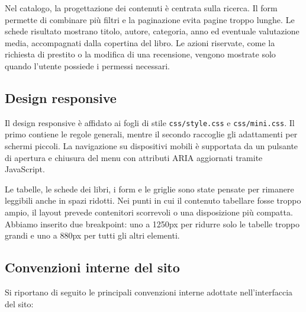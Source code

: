 ﻿\documentclass{article}
\begin{document}
Nel catalogo, la progettazione dei contenuti è centrata sulla ricerca. Il form permette di combinare più filtri e la paginazione evita pagine troppo lunghe. Le schede risultato mostrano titolo, autore, categoria, anno ed eventuale valutazione media, accompagnati dalla copertina del libro. Le azioni riservate, come la richiesta di prestito o la modifica di una recensione, vengono mostrate solo quando l'utente possiede i permessi necessari.

\subsection{Design responsive}
Il design responsive è affidato ai fogli di stile \texttt{css/style.css} e \texttt{css/mini.css}. Il primo contiene le regole generali, mentre il secondo raccoglie gli adattamenti per schermi piccoli. La navigazione su dispositivi mobili è supportata da un pulsante di apertura e chiusura del menu con attributi ARIA aggiornati tramite JavaScript.

Le tabelle, le schede dei libri, i form e le griglie sono state pensate per rimanere leggibili anche in spazi ridotti. Nei punti in cui il contenuto tabellare fosse troppo ampio, il layout prevede contenitori scorrevoli o una disposizione più compatta. Abbiamo inserito due breakpoint: uno a 1250px per ridurre solo le tabelle troppo grandi e uno a 880px per tutti gli altri elementi.

\subsection{Convenzioni interne del sito}
Si riportano di seguito le principali convenzioni interne adottate nell'interfaccia del sito:
\end{document}
